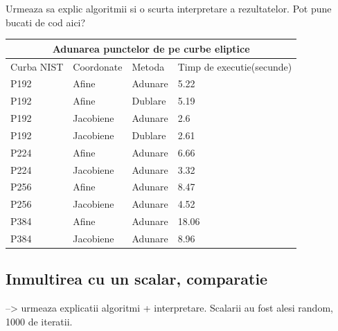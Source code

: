 Urmeaza sa explic algoritmii si o scurta interpretare a rezultatelor. Pot pune bucati de cod aici?

\begin{tabular}{ |p{3cm}||p{3cm}|p{3cm}|p{3cm}|  }
 \hline
 \multicolumn{4}{|c|}{Adunarea punctelor de pe curbe eliptice} \\
 \hline
 Curba NIST& Coordonate &Metoda &Timp de executie(secunde)\\
 \hline
 P192   & Afine    &Adunare& 5.22\\
 P192&Afine  & Dublare & 5.19\\
 P192 &Jacobiene & Adunare& 2.6\\
 P192&Jacobiene & Dublare & 2.61\\
 P224& Afine & Adunare & 6.66\\
 P224& Jacobiene & Adunare   &3.32\\
 P256& Afine  & Adunare& 8.47\\
 P256& Jacobiene  & Adunare& 4.52\\
 P384& Afine  & Adunare& 18.06\\
 P384& Jacobiene  & Adunare& 8.96\\
 \hline
\end{tabular}

\subsection{Inmultirea cu un scalar, comparatie}
\label{subsec:subsec03}
--> urmeaza explicatii algoritmi + interpretare. Scalarii au fost alesi random, 1000 de iteratii.

